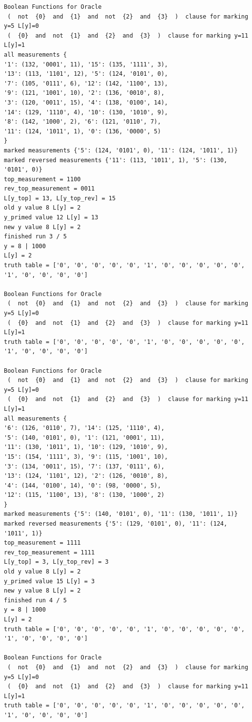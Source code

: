 \documentclass[11pt]{article}
\begin{document}
\begin{verbatim}
Boolean Functions for Oracle
 (  not  {0}  and  {1}  and  not  {2}  and  {3}  )  clause for marking y=5 L[y]=0
 (  {0}  and  not  {1}  and  {2}  and  {3}  )  clause for marking y=11 L[y]=1
all measurements {
'1': (132, '0001', 11), '15': (135, '1111', 3), 
'13': (113, '1101', 12), '5': (124, '0101', 0), 
'7': (105, '0111', 6), '12': (142, '1100', 13), 
'9': (121, '1001', 10), '2': (136, '0010', 8), 
'3': (120, '0011', 15), '4': (138, '0100', 14), 
'14': (129, '1110', 4), '10': (130, '1010', 9), 
'8': (142, '1000', 2), '6': (121, '0110', 7), 
'11': (124, '1011', 1), '0': (136, '0000', 5)
}
marked measurements {'5': (124, '0101', 0), '11': (124, '1011', 1)}
marked reversed measurements {'11': (113, '1011', 1), '5': (130, '0101', 0)}
top_measurement = 1100
rev_top_measurement = 0011
L[y_top] = 13, L[y_top_rev] = 15
old y value 8 L[y] = 2
y_primed value 12 L[y] = 13
new y value 8 L[y] = 2
finished run 3 / 5
y = 8 | 1000
L[y] = 2
truth table = ['0', '0', '0', '0', '0', '1', '0', '0', '0', '0', '0', '1', '0', '0', '0', '0']

Boolean Functions for Oracle
 (  not  {0}  and  {1}  and  not  {2}  and  {3}  )  clause for marking y=5 L[y]=0
 (  {0}  and  not  {1}  and  {2}  and  {3}  )  clause for marking y=11 L[y]=1
truth table = ['0', '0', '0', '0', '0', '1', '0', '0', '0', '0', '0', '1', '0', '0', '0', '0']

Boolean Functions for Oracle
 (  not  {0}  and  {1}  and  not  {2}  and  {3}  )  clause for marking y=5 L[y]=0
 (  {0}  and  not  {1}  and  {2}  and  {3}  )  clause for marking y=11 L[y]=1
all measurements {
'6': (126, '0110', 7), '14': (125, '1110', 4), 
'5': (140, '0101', 0), '1': (121, '0001', 11), 
'11': (130, '1011', 1), '10': (129, '1010', 9), 
'15': (154, '1111', 3), '9': (115, '1001', 10), 
'3': (134, '0011', 15), '7': (137, '0111', 6), 
'13': (124, '1101', 12), '2': (126, '0010', 8), 
'4': (144, '0100', 14), '0': (98, '0000', 5), 
'12': (115, '1100', 13), '8': (130, '1000', 2)
}
marked measurements {'5': (140, '0101', 0), '11': (130, '1011', 1)}
marked reversed measurements {'5': (129, '0101', 0), '11': (124, '1011', 1)}
top_measurement = 1111
rev_top_measurement = 1111
L[y_top] = 3, L[y_top_rev] = 3
old y value 8 L[y] = 2
y_primed value 15 L[y] = 3
new y value 8 L[y] = 2
finished run 4 / 5
y = 8 | 1000
L[y] = 2
truth table = ['0', '0', '0', '0', '0', '1', '0', '0', '0', '0', '0', '1', '0', '0', '0', '0']

Boolean Functions for Oracle
 (  not  {0}  and  {1}  and  not  {2}  and  {3}  )  clause for marking y=5 L[y]=0
 (  {0}  and  not  {1}  and  {2}  and  {3}  )  clause for marking y=11 L[y]=1
truth table = ['0', '0', '0', '0', '0', '1', '0', '0', '0', '0', '0', '1', '0', '0', '0', '0']


\end{verbatim}
\end{document}
